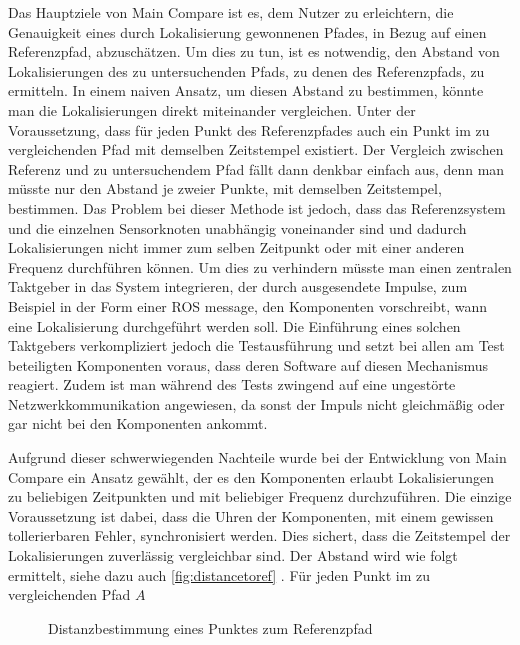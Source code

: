 Das Hauptziele von Main Compare ist es, dem Nutzer zu erleichtern, die
Genauigkeit eines durch Lokalisierung gewonnenen Pfades, in Bezug auf einen
Referenzpfad, abzuschätzen. Um dies zu tun, ist es notwendig, den Abstand von
Lokalisierungen des zu untersuchenden Pfads, zu denen des Referenzpfads, zu
ermitteln. In einem naiven Ansatz, um diesen Abstand zu bestimmen, könnte man die Lokalisierungen direkt
miteinander vergleichen. Unter der Voraussetzung, dass für jeden Punkt des Referenzpfades auch
ein Punkt im zu vergleichenden Pfad mit demselben Zeitstempel existiert. Der
Vergleich zwischen Referenz und zu untersuchendem Pfad fällt dann denkbar einfach aus, denn man müsste nur den Abstand je
zweier Punkte, mit demselben Zeitstempel, bestimmen.
Das Problem bei dieser Methode ist jedoch, dass das Referenzsystem und die
einzelnen Sensorknoten unabhängig voneinander sind und dadurch Lokalisierungen
nicht immer zum selben Zeitpunkt oder mit einer anderen Frequenz durchführen 
können. Um dies zu verhindern müsste man einen zentralen
Taktgeber in das System integrieren, der durch ausgesendete Impulse, zum
Beispiel in der Form einer ROS message, den Komponenten vorschreibt,
wann eine Lokalisierung durchgeführt werden soll.
Die Einführung eines solchen Taktgebers verkompliziert jedoch die
Testausführung und setzt bei allen am Test beteiligten Komponenten voraus, dass
deren Software auf diesen Mechanismus reagiert. Zudem ist man während des Tests
zwingend auf eine ungestörte Netzwerkkommunikation angewiesen, da sonst der
Impuls nicht gleichmäßig oder gar nicht bei den Komponenten ankommt.

Aufgrund dieser schwerwiegenden Nachteile wurde bei der Entwicklung von Main
Compare ein Ansatz gewählt, der es den Komponenten erlaubt Lokalisierungen zu
beliebigen Zeitpunkten und mit beliebiger Frequenz durchzuführen. Die einzige
Voraussetzung ist dabei, dass die Uhren der Komponenten, mit einem gewissen
tollerierbaren Fehler, synchronisiert werden. Dies sichert, dass die Zeitstempel der
Lokalisierungen zuverlässig vergleichbar sind. Der Abstand wird wie folgt
ermittelt, siehe dazu auch \autoref{fig:distancetoref} . Für jeden Punkt im zu vergleichenden Pfad $A$

\begin{figure}[t]
  \begin{center}
  \end{center}
  \caption{Distanzbestimmung eines Punktes zum Referenzpfad}
  \label{fig:distancetoref}
\end{figure}

